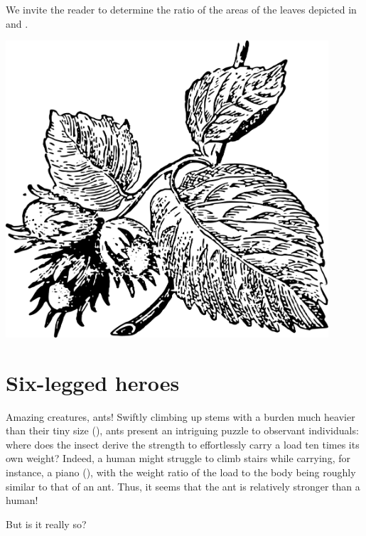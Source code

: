 \ques  We invite the reader to determine the ratio of the areas of the leaves depicted in  and .

\begin{marginfigure}%
\centering
\includegraphics[width=0.9\textwidth]{figures/ch-01/fig-01-23.pdf}
\end{marginfigure}



\section{Six-legged heroes}
\label{sec-1.14}

Amazing creatures, ants! Swiftly climbing up stems with a burden much heavier than their tiny size (), ants present an intriguing puzzle to observant individuals: where does the insect derive the strength to effortlessly carry a load ten times its own weight? Indeed, a human might struggle to climb stairs while carrying, for instance, a piano (), with the weight ratio of the load to the body being roughly similar to that of an ant. Thus, it seems that the ant is relatively stronger than a human!

But is it really so?

